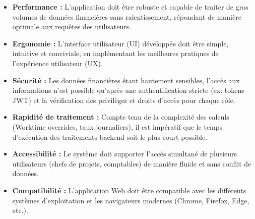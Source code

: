 \documentclass[12pt, a4paper, openany]{report}
\begin{document}
\begin{itemize}
    \setlength{\itemsep}{0.3cm} 
    \renewcommand{\labelitemi}{\textcolor{royalBlue}{\rule{1.2ex}{1.2ex}}} %
    
    \vspace{-0.3cm}
    \item \textcolor{primaryBlue}{\textbf{Performance :}} L'application doit être robuste et capable de traiter de gros volumes de données financières sans ralentissement, répondant de manière optimale aux requêtes des utilisateurs.
    
    \vspace{-0.3cm}
    \item \textcolor{primaryBlue}{\textbf{Ergonomie :}} L'interface utilisateur (UI) développée doit être simple, intuitive et conviviale, en implémentant les meilleures pratiques de l'expérience utilisateur (UX).
    

    \vspace{-0.3cm}
    \item \textcolor{primaryBlue}{\textbf{Sécurité :}} Les données financières étant hautement sensibles, l'accès aux informations n'est possible qu'après une authentification stricte (ex: tokens JWT) et la vérification des privilèges et droits d'accès pour chaque rôle.
    
    \vspace{-0.3cm}
    \item \textcolor{primaryBlue}{\textbf{Rapidité de traitement :}} Compte tenu de la complexité des calculs (Worktime overrides, taux journaliers), il est impératif que le temps d'exécution des traitements backend soit le plus court possible.
    
    \vspace{-0.3cm}
    \item \textcolor{primaryBlue}{\textbf{Accessibilité :}} Le système doit supporter l'accès simultané de plusieurs utilisateurs (chefs de projets, comptables) de manière fluide et sans conflit de données.
    
    \vspace{-0.3cm}
    \item \textcolor{primaryBlue}{\textbf{Compatibilité :}} L'application Web doit être compatible avec les différents systèmes d'exploitation et les navigateurs modernes (Chrome, Firefox, Edge, etc.).
\end{itemize}

\vspace{-0.8cm}
\end{document}

